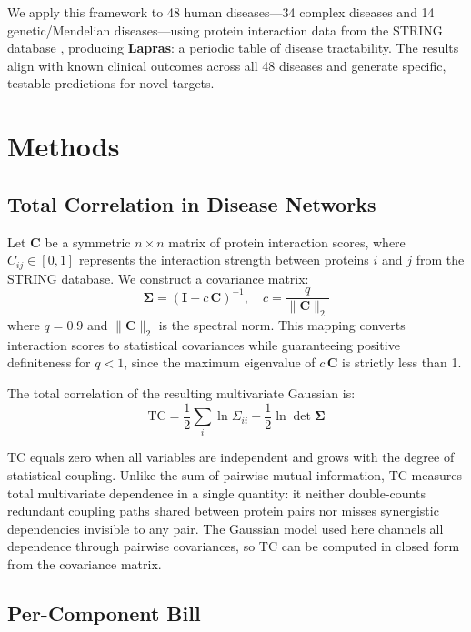 \documentclass[11pt,a4paper]{article}
\begin{document}
We apply this framework to 48 human diseases---34 complex diseases and 14 genetic/Mendelian diseases---using protein interaction data from the STRING database \citep{szklarczyk2023}, producing \textbf{Lapras}: a periodic table of disease tractability. The results align with known clinical outcomes across all 48 diseases and generate specific, testable predictions for novel targets.

\section{Methods}

\subsection{Total Correlation in Disease Networks}

Let $\mathbf{C}$ be a symmetric $n \times n$ matrix of protein interaction scores, where $C_{ij} \in [0,1]$ represents the interaction strength between proteins $i$ and $j$ from the STRING database. We construct a covariance matrix:
\begin{equation}
\boldsymbol{\Sigma} = \left(\mathbf{I} - c\,\mathbf{C}\right)^{-1}, \quad c = \frac{q}{\|\mathbf{C}\|_2}
\label{eq:cov}
\end{equation}
where $q = 0.9$ and $\|\mathbf{C}\|_2$ is the spectral norm. This mapping converts interaction scores to statistical covariances while guaranteeing positive definiteness for $q < 1$, since the maximum eigenvalue of $c\,\mathbf{C}$ is strictly less than 1.

The total correlation of the resulting multivariate Gaussian is:
\begin{equation}
\mathrm{TC} = \frac{1}{2} \sum_i \ln \Sigma_{ii} - \frac{1}{2} \ln \det \boldsymbol{\Sigma}
\label{eq:tc}
\end{equation}

TC equals zero when all variables are independent and grows with the degree of statistical coupling. Unlike the sum of pairwise mutual information, TC measures total multivariate dependence in a single quantity: it neither double-counts redundant coupling paths shared between protein pairs nor misses synergistic dependencies invisible to any pair. The Gaussian model used here channels all dependence through pairwise covariances, so TC can be computed in closed form from the covariance matrix.

\subsection{Per-Component Bill}
\end{document}
